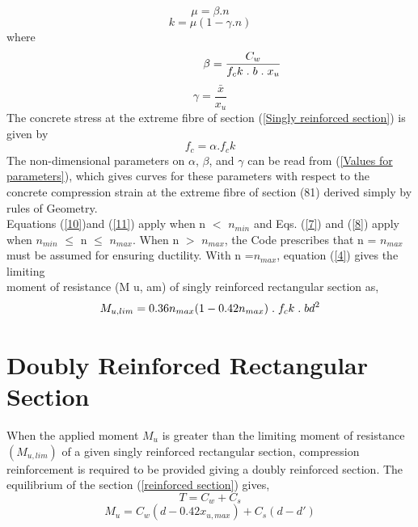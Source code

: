 \newpage
\begin{equation}
\mu=\beta.n
\label{10}
\end{equation}
\begin{equation}
k=\mu(1-\gamma.n)
\label{11}
\end{equation}
where
\begin{equation}
\hspace{2cm} \beta = \frac{C_w}{f_ck\hspace{0.1cm}.\hspace{0.1cm}b\hspace{0.1cm}.\hspace{0.1cm}x_u}
\label{12}
\end{equation}
\begin{equation}
\gamma = \frac{\bar{x}}{x_u}
\label{13}
\end{equation}
The concrete stress at the extreme ﬁbre of section (\fig \ref{Singly reinforced section}) is given by
\begin{equation}
f_c = \alpha.f_ck
\label{14}
\end{equation}
The non-dimensional parameters on $\alpha$, $\beta$, and $\gamma$ can be read from (\fig \ref{Values for parameters}), which gives curves for
these parameters with respect to the concrete compression strain at the extreme ﬁbre of section
(81) derived simply by rules of Geometry.\\
Equations (\eqn \ref{10})and (\eqn \ref{11}) apply when n ${<}$ ${n_{min}}$ and Eqs. (\eqn \ref{7}) and (\eqn \ref{8}) apply when ${n_{min}}$ ${\leq}$ n ${\leq}$ ${n_{max}}$.
When n ${>}$ ${n_{max}}$, the Code prescribes that n = ${n_{max}}$ must be assumed for
ensuring ductility. With n =${n_{max}}$, equation (\eqn \ref{4}) gives the limiting \\
moment of resistance
(M u, am) of singly reinforced rectangular section as,
\begin{equation}
M_{u,lim} = 0.36 n_{max}(1-0.42n_{max})\hspace{0.1cm}.\hspace{0.1cm}f_ck\hspace{0.1cm}.\hspace{0.1cm}bd^2
\label{15}
\end{equation}
\section{Doubly Reinforced Rectangular Section}
When the applied moment ${M_u}$ is greater than the limiting moment of resistance ${(M_{u,lim})}$
of a given singly reinforced rectangular section, compression reinforcement is required to be
provided giving a doubly reinforced section. The equilibrium of the section (\fig \ref{reinforced section}) gives,
\begin{equation}
T = C_w + C_s
\label{16}
\end{equation}
\begin{equation}
M_u = C_w(d-0.42x_{u,max}) + C_s(d-d ')
\label{17}
\end{equation}

